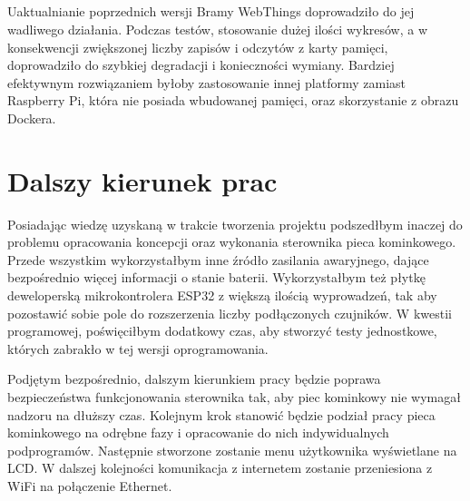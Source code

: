 \documentclass[11pt]{report}
\begin{document}
\section{}
Uaktualnianie poprzednich wersji Bramy WebThings doprowadziło do jej wadliwego działania.
Podczas testów, stosowanie dużej ilości wykresów, a w konsekwencji zwiększonej liczby zapisów i odczytów z karty pamięci, doprowadziło do szybkiej degradacji i konieczności wymiany.
Bardziej efektywnym rozwiązaniem byłoby zastosowanie innej platformy zamiast Raspberry Pi, która nie posiada wbudowanej pamięci, oraz skorzystanie z obrazu Dockera.
 
 \chapter{Dalszy kierunek prac}
Posiadając wiedzę uzyskaną w trakcie tworzenia projektu podszedłbym inaczej do problemu opracowania koncepcji oraz wykonania sterownika pieca kominkowego. Przede wszystkim wykorzystałbym inne źródło zasilania awaryjnego, dające bezpośrednio więcej informacji o stanie baterii. Wykorzystałbym też płytkę deweloperską mikrokontrolera ESP32 z większą ilością wyprowadzeń, tak aby pozostawić sobie pole do rozszerzenia liczby podłączonych czujników. W kwestii programowej, poświęciłbym dodatkowy czas, aby stworzyć testy jednostkowe, których zabrakło w tej wersji oprogramowania.

Podjętym bezpośrednio, dalszym kierunkiem pracy będzie poprawa bezpieczeństwa funkcjonowania sterownika tak, aby piec kominkowy nie wymagał nadzoru na dłuższy czas.
Kolejnym krok stanowić będzie podział pracy pieca kominkowego na odrębne fazy i opracowanie do nich indywidualnych podprogramów. Następnie stworzone zostanie menu użytkownika wyświetlane na LCD.
W dalszej kolejności komunikacja z internetem zostanie przeniesiona z WiFi na połączenie Ethernet.



 
 \printbibliography[title={Książki},type=book]
 
 \printbibliography[title={Artykuły},type=article]
 
 \printbibliography[title={Prace dyplomowe}, type=thesis]
 
 \printbibliography[title={Materiały konferencyjne},type=inproceedings]
 
 \printbibliography[title={Pozostałe źródła}, nottype=article, nottype=book, nottype=inproceedings, nottype=thesis]

 
\end{document}
